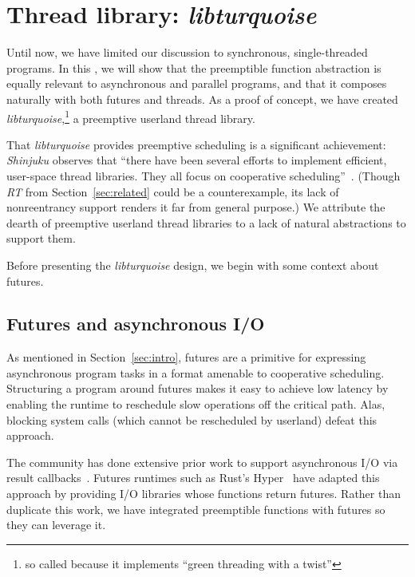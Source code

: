 \section{Thread library: \textit{libturquoise}}
\label{sec:libturquoise}

Until now, we have limited our discussion to synchronous, single-threaded programs.
In this \chap, we will show that the preemptible function abstraction is equally
relevant to asynchronous and parallel programs, and that it composes naturally with
both futures and threads.  As a proof of concept, we have created
\textit{libturquoise},\footnote{so called because it implements ``green threading
with a twist''} a preemptive userland thread library.

That \textit{libturquoise} provides preemptive scheduling is a significant
achievement:\@
\textit{Shinjuku} observes that ``there have been several efforts to implement
efficient, user-space thread libraries.  They all focus on cooperative
scheduling''~\cite{Kaffes:nsdi2019}.  (Though \textit{RT} from
Section~\ref{sec:related} could be a counterexample, its lack of nonreentrancy
support renders it far from general purpose.)  We attribute the dearth of preemptive
userland thread libraries to a lack of natural abstractions to support them.

Before presenting the \textit{libturquoise} design, we begin with some context about
futures.


\subsection{Futures and asynchronous I/O}

As mentioned in Section~\ref{sec:intro}, futures are a primitive for expressing
asynchronous program tasks in a format amenable to cooperative scheduling.
Structuring a program around futures makes it easy to achieve low latency by enabling
the runtime to reschedule slow operations off the critical path.  Alas, blocking
system calls (which cannot be rescheduled by userland) defeat this approach.

The community has done extensive prior work to support asynchronous I/O via result
callbacks~\cite{www-libevent, www-libev, www-libuv, www-mordor}.  Futures runtimes
such as Rust's Hyper~\cite{www-hyper} have adapted this approach by providing I/O
libraries whose functions return futures.  Rather than duplicate this work, we have
integrated preemptible functions with futures so they can leverage it.


